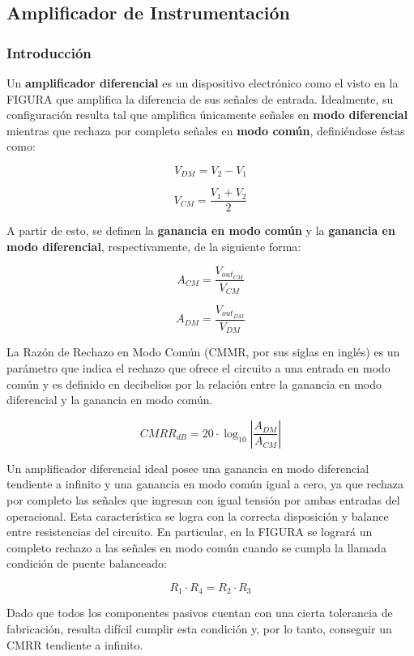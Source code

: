 \subsection{Amplificador de Instrumentación}

\subsubsection{Introducción}

Un \textbf{amplificador diferencial} es un dispositivo electrónico como el visto en la FIGURA que amplifica la diferencia de sus señales de entrada. Idealmente, su configuración resulta tal que amplifica únicamente señales en \textbf{modo diferencial} mientras que rechaza por completo señales en \textbf{modo común}, definiéndose éstas como:

$$V_{DM}=V_{2}-V_{1}$$

$$V_{CM}=\frac{V_{1}+V_{2}}{2}$$

A partir de esto, se definen la \textbf{ganancia en modo común} y la \textbf{ganancia en modo diferencial}, respectivamente, de la siguiente forma:

$$A_{CM} = \frac{V_{out_{CM}}}{V_{CM}}$$

$$A_{DM} = \frac{V_{out_{DM}}}{V_{DM}}$$

La Razón de Rechazo en Modo Común (CMMR, por sus siglas en inglés) es un parámetro que indica el rechazo que ofrece el circuito a una entrada en modo común y es definido en decibelios por la relación entre la ganancia en modo diferencial y la ganancia en modo común. 

$$CMRR_{dB} = 20\cdot \log_{10}\left | \frac{A_{DM}}{A_{CM}} \right |$$

Un amplificador diferencial ideal posee una ganancia en modo diferencial tendiente a infinito y una ganancia en modo común igual a cero, ya que rechaza por completo las señales que ingresan con igual tensión por ambas entradas del operacional. Esta característica se logra con la correcta disposición y balance entre resistencias del circuito. En particular, en la FIGURA se logrará un completo rechazo a las señales en modo común cuando se cumpla la llamada condición de puente balanceado:

$$R_1\cdot R_4 = R_2\cdot  R_3$$

Dado que todos los componentes pasivos cuentan con una cierta tolerancia de fabricación, resulta difícil cumplir esta condición y, por lo tanto, conseguir un CMRR tendiente a infinito. 

